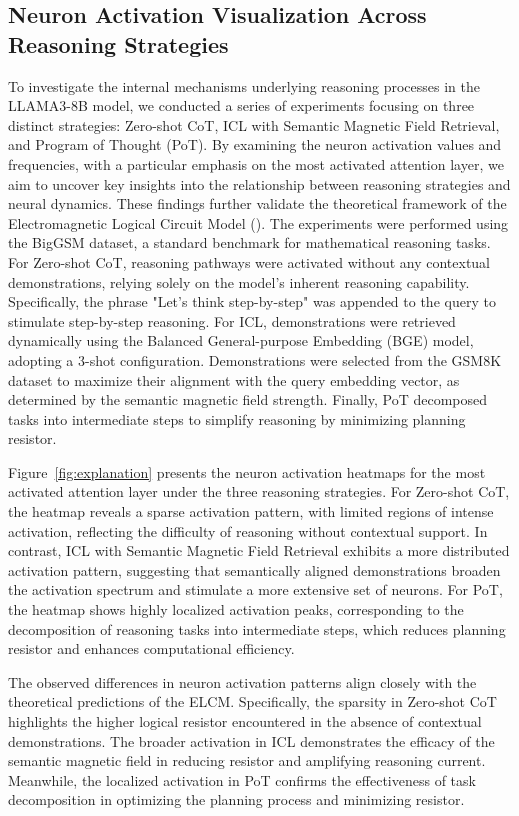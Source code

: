 


\subsection{Neuron Activation Visualization Across Reasoning Strategies}
To investigate the internal mechanisms underlying reasoning processes in the LLAMA3-8B model, we conducted a series of experiments focusing on three distinct strategies: Zero-shot CoT, ICL with Semantic Magnetic Field Retrieval, and Program of Thought (PoT). By examining the neuron activation values and frequencies, with a particular emphasis on the most activated attention layer, we aim to uncover key insights into the relationship between reasoning strategies and neural dynamics. These findings further validate the theoretical framework of the Electromagnetic Logical Circuit Model (\modelname{}).
The experiments were performed using the BigGSM dataset, a standard benchmark for mathematical reasoning tasks. For Zero-shot CoT, reasoning pathways were activated without any contextual demonstrations, relying solely on the model’s inherent reasoning capability. Specifically, the phrase "Let's think step-by-step" was appended to the query to stimulate step-by-step reasoning. For ICL, demonstrations were retrieved dynamically using the Balanced General-purpose Embedding (BGE) model, adopting a 3-shot configuration. Demonstrations were selected from the GSM8K dataset to maximize their alignment with the query embedding vector, as determined by the semantic magnetic field strength. Finally, PoT decomposed tasks into intermediate steps to simplify reasoning by minimizing planning resistor.


Figure~\ref{fig:explanation} presents the neuron activation heatmaps for the most activated attention layer under the three reasoning strategies. For Zero-shot CoT, the heatmap reveals a sparse activation pattern, with limited regions of intense activation, reflecting the difficulty of reasoning without contextual support. In contrast, ICL with Semantic Magnetic Field Retrieval exhibits a more distributed activation pattern, suggesting that semantically aligned demonstrations broaden the activation spectrum and stimulate a more extensive set of neurons. For PoT, the heatmap shows highly localized activation peaks, corresponding to the decomposition of reasoning tasks into intermediate steps, which reduces planning resistor and enhances computational efficiency.

The observed differences in neuron activation patterns align closely with the theoretical predictions of the ELCM. Specifically, the sparsity in Zero-shot CoT highlights the higher logical resistor encountered in the absence of contextual demonstrations. The broader activation in ICL demonstrates the efficacy of the semantic magnetic field in reducing resistor and amplifying reasoning current. Meanwhile, the localized activation in PoT confirms the effectiveness of task decomposition in optimizing the planning process and minimizing resistor.

